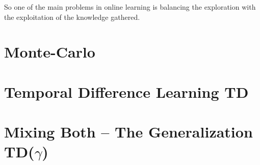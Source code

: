 So one of the main problems in online learning is balancing the exploration with the exploitation of the knowledge gathered. 

\section{Monte-Carlo}
\section{Temporal Difference Learning TD}
\section{Mixing Both -- The Generalization TD(\(\gamma\))}

\endinput
